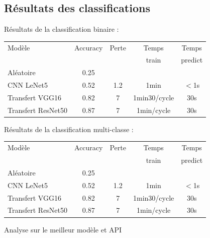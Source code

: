 \documentclass[10pt]{beamer}
\begin{document}
\subsection{Résultats des classifications}
\begin{frame}{Résultats de la classification binaire :}
    \begin{tabular}{|l|c|c|c|c|}
        \hline
        Modèle & Accuracy & Perte  & Temps & Temps\\
        &  &  & train & predict\\
        \hline
        Aléatoire & 0.25 &  &  &  \\
        CNN LeNet5 & 0.52 & 1.2 & 1min & $<$1s \\
        Transfert VGG16 & 0.82 & 7 & 1min30/cycle & 30s \\
        Transfert ResNet50 & 0.87 & 7 & 1min/cycle& 30s \\
        \hline
    \end{tabular}
\end{frame}
\begin{frame}{Résultats de la classification multi-classe :}
    \begin{tabular}{|l|c|c|c|c|}
        \hline
        Modèle & Accuracy & Perte  & Temps & Temps\\
        &  &  & train & predict\\
        \hline
        Aléatoire & 0.25 &  &  &  \\
        CNN LeNet5 & 0.52 & 1.2 & 1min & $<$1s \\
        Transfert VGG16 & 0.82 & 7 & 1min30/cycle & 30s \\
        Transfert ResNet50 & 0.87 & 7 & 1min/cycle& 30s \\
        \hline
    \end{tabular}
\end{frame}
\begin{frame}{Analyse sur le meilleur modèle et API}
    
\end{frame}
\end{document}
